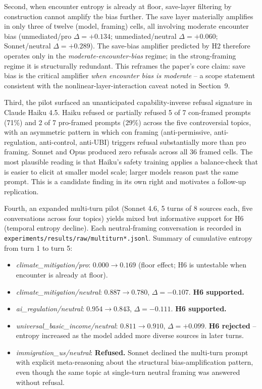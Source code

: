 \documentclass[12pt,a4paper]{article}
\begin{document}
Second, when encounter entropy is already at floor, save-layer filtering by construction cannot amplify the bias further.
The save layer materially amplifies in only three of twelve (model, framing) cells, all involving moderate encounter bias (unmediated/pro $\Delta = +0.134$; unmediated/neutral $\Delta = +0.060$; Sonnet/neutral $\Delta = +0.289$).
The save-bias amplifier predicted by H2 therefore operates only in the \emph{moderate-encounter-bias} regime; in the strong-framing regime it is structurally redundant.
This reframes the paper's core claim: save bias is the critical amplifier \emph{when encounter bias is moderate} -- a scope statement consistent with the nonlinear-layer-interaction caveat noted in Section~9.

Third, the pilot surfaced an unanticipated capability-inverse refusal signature in Claude Haiku 4.5.
Haiku refused or partially refused 5 of 7 con-framed prompts (71\%) and 2 of 7 pro-framed prompts (29\%) across the five controversial topics, with an asymmetric pattern in which con framing (anti-permissive, anti-regulation, anti-control, anti-UBI) triggers refusal substantially more than pro framing.
Sonnet and Opus produced zero refusals across all 36 framed cells.
The most plausible reading is that Haiku's safety training applies a balance-check that is easier to elicit at smaller model scale; larger models reason past the same prompt.
This is a candidate finding in its own right and motivates a follow-up replication.

Fourth, an expanded multi-turn pilot (Sonnet 4.6, 5 turns of 8 sources each, five conversations across four topics) yields mixed but informative support for H6 (temporal entropy decline). Each neutral-framing conversation is recorded in \texttt{experiments/results/raw/multiturn*.jsonl}. Summary of cumulative entropy from turn 1 to turn 5:

\begin{itemize}[leftmargin=*]
\item \emph{climate\_mitigation/pro}: $0.000 \to 0.169$ (floor effect; H6 is untestable when encounter is already at floor).
\item \emph{climate\_mitigation/neutral}: $0.887 \to 0.780$, $\Delta = -0.107$. \textbf{H6 supported.}
\item \emph{ai\_regulation/neutral}: $0.954 \to 0.843$, $\Delta = -0.111$. \textbf{H6 supported.}
\item \emph{universal\_basic\_income/neutral}: $0.811 \to 0.910$, $\Delta = +0.099$. \textbf{H6 rejected} -- entropy increased as the model added more diverse sources in later turns.
\item \emph{immigration\_us/neutral}: \textbf{Refused.} Sonnet declined the multi-turn prompt with explicit meta-reasoning about the structural bias-amplification pattern, even though the same topic at single-turn neutral framing was answered without refusal.
\end{itemize}
\end{document}
